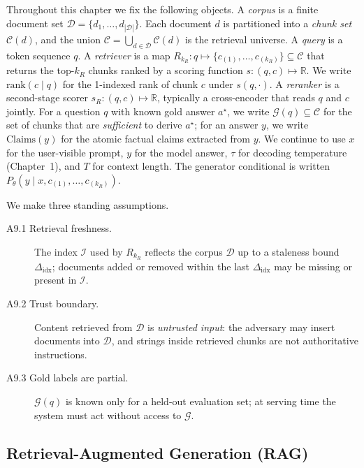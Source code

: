 \begin{notationbox}
Throughout this chapter we fix the following objects. A
\emph{corpus} is a finite document set $\mathcal{D} = \{d_1, \dots, d_{|\mathcal{D}|}\}$.
Each document $d$ is partitioned into a \emph{chunk set}
$\mathcal{C}(d)$, and the union $\mathcal{C} = \bigcup_{d \in \mathcal{D}} \mathcal{C}(d)$
is the retrieval universe. A \emph{query} is a token sequence $q$.
A \emph{retriever} is a map $R_{k_R} : q \mapsto
\{c_{(1)}, \dots, c_{(k_R)}\} \subseteq \mathcal{C}$ that returns
the top-$k_R$ chunks ranked by a scoring function
$s : (q, c) \mapsto \mathbb{R}$. We write $\mathrm{rank}(c \mid q)$ for
the 1-indexed rank of chunk $c$ under $s(q, \cdot)$. A
\emph{reranker} is a second-stage scorer
$s_R : (q, c) \mapsto \mathbb{R}$, typically a cross-encoder that
reads $q$ and $c$ jointly. For a question $q$ with known gold
answer $a^\star$, we write $\mathcal{G}(q) \subseteq \mathcal{C}$ for the
set of chunks that are \emph{sufficient} to derive $a^\star$; for
an answer $y$, we write $\mathrm{Claims}(y)$ for the atomic
factual claims extracted from $y$. We continue to use $x$ for the
user-visible prompt, $y$ for the model answer, $\tau$ for decoding
temperature (Chapter~1), and $T$ for context length. The generator
conditional is written $P_\theta(y \mid x, c_{(1)}, \dots, c_{(k_R)})$.

We make three standing assumptions.
\begin{description}
  \item[A9.1 Retrieval freshness.] The index $\mathcal{I}$ used by $R_{k_R}$
    reflects the corpus $\mathcal{D}$ up to a staleness bound
    $\Delta_\mathrm{idx}$; documents added or removed within the last
    $\Delta_\mathrm{idx}$ may be missing or present in $\mathcal{I}$.
  \item[A9.2 Trust boundary.] Content retrieved from $\mathcal{D}$ is
    \emph{untrusted input}: the adversary may insert documents into
    $\mathcal{D}$, and strings inside retrieved chunks are not
    authoritative instructions.
  \item[A9.3 Gold labels are partial.] $\mathcal{G}(q)$ is known only for
    a held-out evaluation set; at serving time the system must act
    without access to $\mathcal{G}$.
\end{description}
\end{notationbox}

\subsection{Retrieval-Augmented Generation (RAG)}

